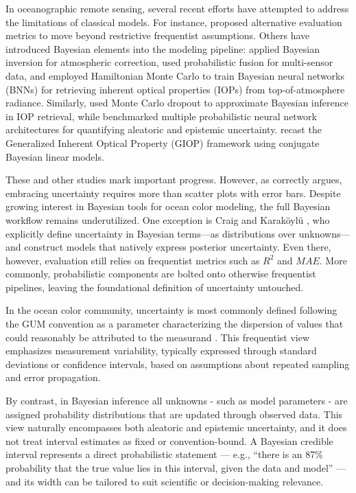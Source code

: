 \documentclass[preprint,authoryear]{elsarticle}
\begin{document}
In oceanographic remote sensing, several recent efforts have attempted to address the limitations of classical models. For instance, \cite{seegers2018} proposed alternative evaluation metrics to move beyond restrictive frequentist assumptions. Others have introduced Bayesian elements into the modeling pipeline: \cite{frouin2013} applied Bayesian inversion for atmospheric correction, \cite{shi2015} used probabilistic fusion for multi-sensor data, and \cite{craig2019} employed Hamiltonian Monte Carlo to train Bayesian neural networks (BNNs) for retrieving inherent optical properties (IOPs) from top-of-atmosphere radiance. Similarly, \cite{werther2022} used Monte Carlo dropout to approximate Bayesian inference in IOP retrieval, while \cite{werther2025} benchmarked multiple probabilistic neural network architectures for quantifying aleatoric and epistemic uncertainty. \cite{erickson2023} recast the Generalized Inherent Optical Property (GIOP) framework using conjugate Bayesian linear models.

These and other studies mark important progress. However, as \cite{werther2023} correctly argues, embracing uncertainty requires more than scatter plots with error bars. Despite growing interest in Bayesian tools for ocean color modeling, the full Bayesian workflow \citep{gelman2020bayesianworkflow, wolkovich2024fourstepbayesianworkflowimproving} remains underutilized. One exception is Craig and Karaköylü \citep{craig2019}, who explicitly define uncertainty in Bayesian terms—as distributions over unknowns—and construct models that natively express posterior uncertainty. Even there, however, evaluation still relies on frequentist metrics such as \(R^2\) and $MAE$. More commonly, probabilistic components are bolted onto otherwise frequentist pipelines, leaving the foundational definition of uncertainty untouched.

In the ocean color community, uncertainty is most commonly defined following the GUM convention \citep{gum2008} as a parameter characterizing the dispersion of values that could reasonably be attributed to the measurand \citep{ioccg2020uncertainties}. This frequentist view emphasizes measurement variability, typically expressed through standard deviations or confidence intervals, based on assumptions about repeated sampling and error propagation.

By contrast, in Bayesian inference all unknowns - such as model parameters - are assigned probability distributions that are updated through observed data. This view naturally encompasses both aleatoric and epistemic uncertainty, and it does not treat interval estimates as fixed or convention-bound. A Bayesian credible interval represents a direct probabilistic statement — e.g., “there is an 87\% probability that the true value lies in this interval, given the data and model” — and its width can be tailored to suit scientific or decision-making relevance.
\end{document}
